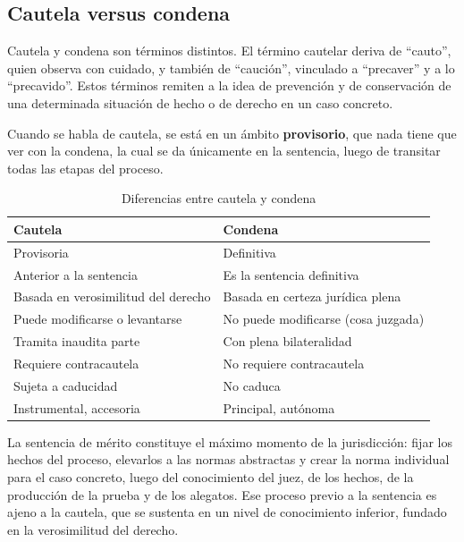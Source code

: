 \documentclass[12pt,oneside]{book}
\begin{document}
\subsection{Cautela versus condena}

Cautela y condena son términos distintos. El término cautelar deriva de ``cauto'', quien observa con cuidado, y también de ``caución'', vinculado a ``precaver'' y a lo ``precavido''. Estos términos remiten a la idea de prevención y de conservación de una determinada situación de hecho o de derecho en un caso concreto.

\begin{important}
Cuando se habla de cautela, se está en un ámbito \textbf{provisorio}, que nada tiene que ver con la condena, la cual se da únicamente en la sentencia, luego de transitar todas las etapas del proceso.
\end{important}

\begin{table}[H]
\centering
\begin{tabularx}{\textwidth}{
    >{\raggedright\arraybackslash}X
    >{\raggedright\arraybackslash}X
}
\toprule
\textbf{Cautela} & \textbf{Condena} \\
\midrule
Provisoria & Definitiva \\
Anterior a la sentencia & Es la sentencia definitiva \\
Basada en verosimilitud del derecho & Basada en certeza jurídica plena \\
Puede modificarse o levantarse & No puede modificarse (cosa juzgada) \\
Tramita inaudita parte & Con plena bilateralidad \\
Requiere contracautela & No requiere contracautela \\
Sujeta a caducidad & No caduca \\
Instrumental, accesoria & Principal, autónoma \\
\bottomrule
\end{tabularx}
\caption{Diferencias entre cautela y condena}
\end{table}

La sentencia de mérito constituye el máximo momento de la jurisdicción: fijar los hechos del proceso, elevarlos a las normas abstractas y crear la norma individual para el caso concreto, luego del conocimiento del juez, de los hechos, de la producción de la prueba y de los alegatos. Ese proceso previo a la sentencia es ajeno a la cautela, que se sustenta en un nivel de conocimiento inferior, fundado en la verosimilitud del derecho.
\end{document}
